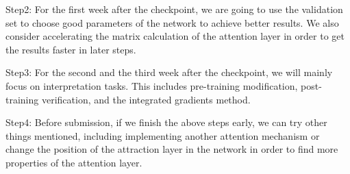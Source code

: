 \documentclass[12pt]{article}
\begin{document}
Step2: For the first week after the checkpoint, we are going to use the validation set to choose good parameters of the network to achieve better results. We also consider accelerating the matrix calculation of the attention layer in order to get the results faster in later steps.

Step3: For the second and the third week after the checkpoint, we will mainly focus on interpretation tasks. This includes pre-training modification, post-training verification, and the integrated gradients method.

Step4: Before submission, if we finish the above steps early, we can try other things mentioned, including implementing another attention mechanism or change the position of the attraction layer in the network in order to find more properties of the attention layer.

%
\newpage



\end{document}
